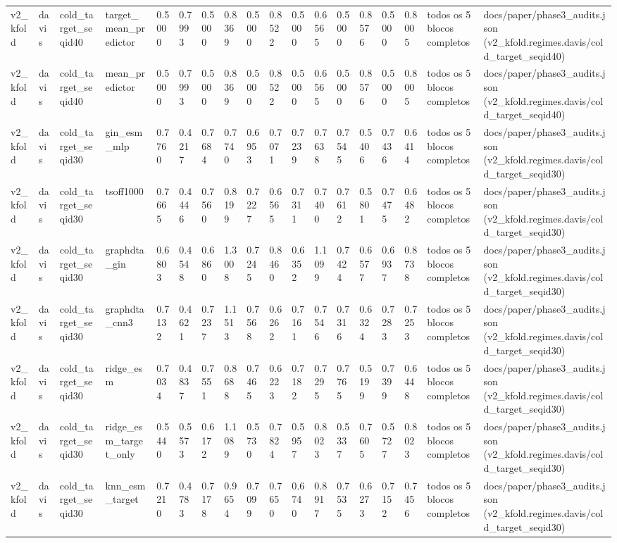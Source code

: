 \begin{table}[htbp]
\begin{tabular}{llllllllllllllllll}
v2\_kfold & davis & cold\_target\_seqid40 & target\_mean\_predictor & 0.5000 & 0.7993 & 0.5000 & 0.8369 & 0.5000 & 0.8522 & 0.5000 & 0.6565 & 0.5000 & 0.8576 & 0.5000 & 0.8005 & todos os 5 blocos completos & docs/paper/phase3\_audits.json (v2\_kfold.regimes.davis/cold\_target\_seqid40) \\
v2\_kfold & davis & cold\_target\_seqid40 & mean\_predictor & 0.5000 & 0.7993 & 0.5000 & 0.8369 & 0.5000 & 0.8522 & 0.5000 & 0.6565 & 0.5000 & 0.8576 & 0.5000 & 0.8005 & todos os 5 blocos completos & docs/paper/phase3\_audits.json (v2\_kfold.regimes.davis/cold\_target\_seqid40) \\
v2\_kfold & davis & cold\_target\_seqid30 & gin\_esm\_mlp & 0.7760 & 0.4217 & 0.7684 & 0.7740 & 0.6953 & 0.7071 & 0.7239 & 0.7638 & 0.7545 & 0.5406 & 0.7436 & 0.6414 & todos os 5 blocos completos & docs/paper/phase3\_audits.json (v2\_kfold.regimes.davis/cold\_target\_seqid30) \\
v2\_kfold & davis & cold\_target\_seqid30 & tsoff1000 & 0.7665 & 0.4446 & 0.7560 & 0.8199 & 0.7227 & 0.6565 & 0.7311 & 0.7400 & 0.7612 & 0.5801 & 0.7475 & 0.6482 & todos os 5 blocos completos & docs/paper/phase3\_audits.json (v2\_kfold.regimes.davis/cold\_target\_seqid30) \\
v2\_kfold & davis & cold\_target\_seqid30 & graphdta\_gin & 0.6803 & 0.4548 & 0.6860 & 1.3008 & 0.7245 & 0.8460 & 0.6352 & 1.1099 & 0.7424 & 0.6577 & 0.6937 & 0.8738 & todos os 5 blocos completos & docs/paper/phase3\_audits.json (v2\_kfold.regimes.davis/cold\_target\_seqid30) \\
v2\_kfold & davis & cold\_target\_seqid30 & graphdta\_cnn3 & 0.7132 & 0.4621 & 0.7237 & 1.1513 & 0.7568 & 0.6262 & 0.7161 & 0.7546 & 0.7316 & 0.6324 & 0.7283 & 0.7253 & todos os 5 blocos completos & docs/paper/phase3\_audits.json (v2\_kfold.regimes.davis/cold\_target\_seqid30) \\
v2\_kfold & davis & cold\_target\_seqid30 & ridge\_esm & 0.7034 & 0.4837 & 0.7551 & 0.8688 & 0.7465 & 0.6223 & 0.7182 & 0.7295 & 0.7765 & 0.5199 & 0.7399 & 0.6448 & todos os 5 blocos completos & docs/paper/phase3\_audits.json (v2\_kfold.regimes.davis/cold\_target\_seqid30) \\
v2\_kfold & davis & cold\_target\_seqid30 & ridge\_esm\_target\_only & 0.5440 & 0.5573 & 0.6172 & 1.1089 & 0.5730 & 0.7824 & 0.5957 & 0.8023 & 0.5337 & 0.7605 & 0.5727 & 0.8023 & todos os 5 blocos completos & docs/paper/phase3\_audits.json (v2\_kfold.regimes.davis/cold\_target\_seqid30) \\
v2\_kfold & davis & cold\_target\_seqid30 & knn\_esm\_target & 0.7210 & 0.4783 & 0.7178 & 0.9654 & 0.7099 & 0.7650 & 0.6740 & 0.8917 & 0.7535 & 0.6273 & 0.7152 & 0.7456 & todos os 5 blocos completos & docs/paper/phase3\_audits.json (v2\_kfold.regimes.davis/cold\_target\_seqid30) \\

\end{tabular}
\end{table}
